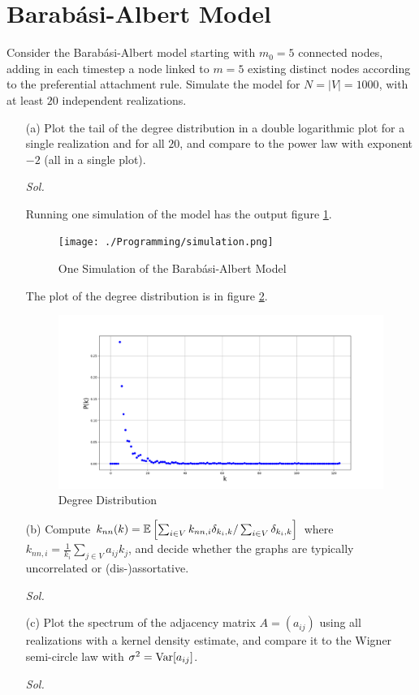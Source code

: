 \section{Barab\'{a}si-Albert Model}

Consider the Barab\'{a}si-Albert model starting with $m_0 = 5$ connected nodes, adding in each timestep a node linked to $m=5$ existing distinct nodes according to the preferential attachment rule. Simulate the model for $N = |V| = 1000$, with at least $20$ independent realizations. 

\begin{enumerate}
    \item[(a)] Plot the tail of the degree distribution in a double logarithmic plot for a single realization and for all $20$, and compare to the power law with exponent $-2$ (all in a single plot).
    
    \textit{ Sol. }
    
    Running one simulation of the model has the output figure \ref{fig2}.
    \begin{figure}[!ht]
        \texttt{[image: ./Programming/simulation.png]}
        \caption{One Simulation of the Barab\'{a}si-Albert Model}
        \label{fig2}
    \end{figure}
    The plot of the degree distribution is in figure \ref{fig3}.
    \begin{figure}[!ht]
        \includegraphics[width=18cm]{./Programming/degree-distribution.png}
        \caption{Degree Distribution}
        \label{fig3}
    \end{figure}
    \item[(b)] Compute $k_{nn}(k) = \mathbb{E} \left[ \sum_{i \in V} k_{nn, i} \delta_{k_i, k} / \sum_{i\in V} \delta_{k_i, k}\right]$ where $k_{nn, i} = \frac{1}{k_i} \sum_{j \in V} a_{ij} k_j$, and decide whether the graphs are typically uncorrelated or (dis-)assortative.
    
    \textit{ Sol. }

    \item[(c)] Plot the spectrum of the adjacency matrix $A = (a_{ij})$ using all realizations with a kernel density estimate, and compare it to the Wigner semi-circle law with $\sigma^2 = \mathrm{Var} [a_{ij}]$.
    
    \textit{ Sol. }

\end{enumerate}